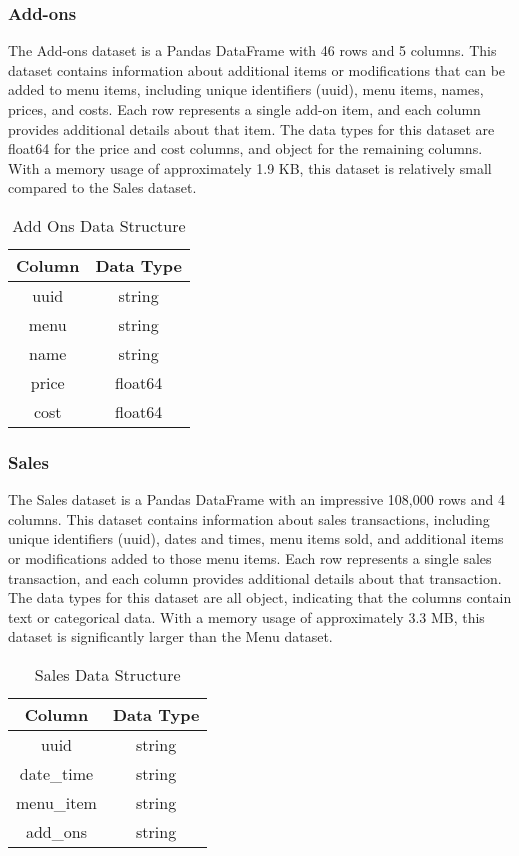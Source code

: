 \subsubsection{Add-ons}

The Add-ons dataset is a Pandas DataFrame with 46 rows and 5 columns. This dataset contains information about additional items or modifications that can be added to menu items, including unique identifiers (uuid), menu items, names, prices, and costs. Each row represents a single add-on item, and each column provides additional details about that item. The data types for this dataset are float64 for the price and cost columns, and object for the remaining columns. With a memory usage of approximately 1.9 KB, this dataset is relatively small compared to the Sales dataset.

\begin{table}[H]
	\centering
	\begin{tabular}{cc}
		\toprule
		Column & Data Type \\
		\midrule
		uuid & string \\
		menu & string \\
		name & string \\
		price & float64 \\
		cost & float64 \\
		\bottomrule
	\end{tabular}
	\caption{Add Ons Data Structure}
	\label{tab:add_ons_data_structure}
\end{table}

\subsubsection{Sales}

The Sales dataset is a Pandas DataFrame with an impressive 108,000 rows and 4 columns. This dataset contains information about sales transactions, including unique identifiers (uuid), dates and times, menu items sold, and additional items or modifications added to those menu items. Each row represents a single sales transaction, and each column provides additional details about that transaction. The data types for this dataset are all object, indicating that the columns contain text or categorical data. With a memory usage of approximately 3.3 MB, this dataset is significantly larger than the Menu dataset.

\begin{table}[H]
	\centering
	\begin{tabular}{cc}
		\toprule
		Column & Data Type \\
		\midrule
		uuid & string \\
		date{\_}time & string \\
		menu{\_}item & string \\
		add{\_}ons & string \\
		\bottomrule
	\end{tabular}
	\caption{Sales Data Structure}
	\label{tab:sales_data_structure}
\end{table}

